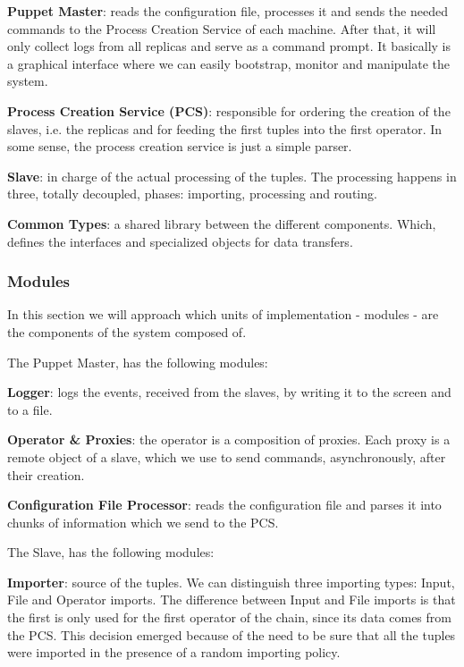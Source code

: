 \documentclass[times, 10pt,twocolumn]{article}
\begin{document}
\textbf{Puppet Master}: reads the configuration file, processes it and sends the needed commands to the Process Creation Service of each machine. After that, it will only collect logs from all replicas and serve as a command prompt. It basically is a graphical interface where we can easily bootstrap, monitor and manipulate the system.

\textbf{Process Creation Service (PCS)}: responsible for ordering the creation of the slaves, i.e. the replicas and for feeding the first tuples into the first operator. In some sense, the process creation service is just a simple parser.

\textbf{Slave}: in charge of the actual processing of the tuples. The processing happens in three, totally decoupled, phases: importing, processing and routing. 

\textbf{Common Types}: a shared library between the different components. Which, defines the interfaces and specialized objects for data transfers.




\subsubsection{Modules}

In this section we will approach which units of implementation - modules - are the components of the system composed of.

The Puppet Master, has the following modules: 

\textbf{Logger}: logs the events, received from the slaves, by writing it to the screen and to a file.

\textbf{Operator \& Proxies}: the operator is a composition of proxies. Each proxy is a remote object of a slave, which we use to send commands, asynchronously, after their creation.

\textbf{Configuration File Processor}: reads the configuration file and parses it into chunks of information which we send to the PCS.

The Slave, has the following modules:

\textbf{Importer}: source of the tuples. We can distinguish three importing types: Input, File and Operator imports. The difference between Input and File imports is that the first is only used for the first operator of the chain, since its data comes from the PCS. This decision emerged because of the need to be sure that all the tuples were imported in the presence of a random importing policy. 
\end{document}
